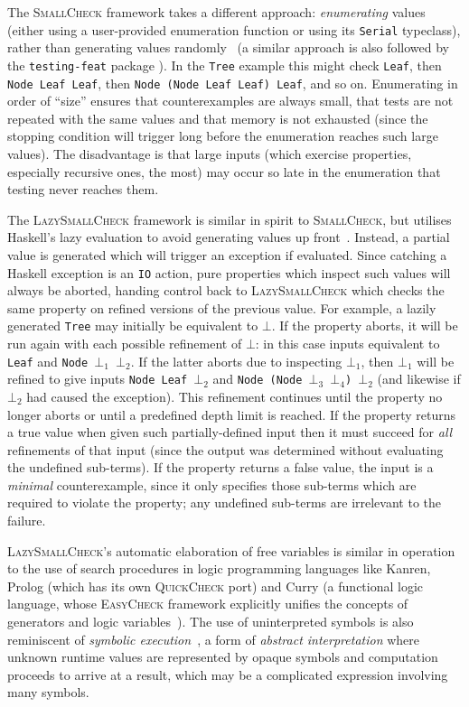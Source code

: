 The \textsc{SmallCheck} framework takes a different approach: \emph{enumerating}
values (either using a user-provided enumeration function or using its
\texttt{Serial} typeclass), rather than generating values
randomly~\cite{runciman2008smallcheck} (a similar approach is also followed by
the \texttt{testing-feat} package \iffalse \cite{}TODO} \fi). In the
\texttt{Tree} example this might check \texttt{Leaf}, then \texttt{Node Leaf
  Leaf}, then \texttt{Node (Node Leaf Leaf) Leaf}, and so on. Enumerating in
order of ``size'' ensures that counterexamples are always small, that tests are
not repeated with the same values and that memory is not exhausted (since the
stopping condition will trigger long before the enumeration reaches such large
values). The disadvantage is that large inputs (which exercise properties,
especially recursive ones, the most) may occur so late in the enumeration that
testing never reaches them.

The \textsc{LazySmallCheck} framework is similar in spirit to
\textsc{SmallCheck}, but utilises Haskell's lazy evaluation to avoid generating
values up front~\cite{reich2013advances}. Instead, a partial value is generated
which will trigger an exception if evaluated. Since catching a Haskell exception
is an \texttt{IO} action, pure properties which inspect such values will always
be aborted, handing control back to \textsc{LazySmallCheck} which checks the
same property on refined versions of the previous value. For example, a lazily
generated \texttt{Tree} may initially be equivalent to $\bot$. If the property
aborts, it will be run again with each possible refinement of $\bot$: in this
case inputs equivalent to \texttt{Leaf} and \texttt{Node~$\bot_1$~$\bot_2$}. If
the latter aborts due to inspecting $\bot_1$, then $\bot_1$ will be refined to
give inputs \texttt{Node~Leaf~$\bot_2$} and
\texttt{Node~(Node~$\bot_3$~$\bot_4$)~$\bot_2$} (and likewise if $\bot_2$ had
caused the exception). This refinement continues until the property no longer
aborts or until a predefined depth limit is reached. If the property returns a
true value when given such partially-defined input then it must succeed for
\emph{all} refinements of that input (since the output was determined without
evaluating the undefined sub-terms). If the property returns a false value, the
input is a \emph{minimal} counterexample, since it only specifies those
sub-terms which are required to violate the property; any undefined sub-terms
are irrelevant to the failure.

\textsc{LazySmallCheck}'s automatic elaboration of free variables is similar in
operation to the use of search procedures in logic programming languages like
Kanren, Prolog (which has its own \textsc{QuickCheck} port) and Curry (a
functional logic language, whose \textsc{EasyCheck} framework explicitly
unifies the concepts of generators and logic
variables~\cite{christiansen2008easycheck}). The use of uninterpreted symbols
is also reminiscent of \emph{symbolic execution}~\cite{king1976symbolic}, a form
of \emph{abstract interpretation} where unknown runtime values are represented
by opaque symbols and computation proceeds to arrive at a result, which may be a
complicated expression involving many symbols.
